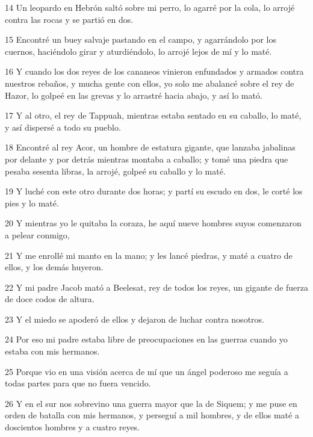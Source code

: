 \par 14 Un leopardo en Hebrón saltó sobre mi perro, lo agarré por la cola, lo arrojé contra las rocas y se partió en dos.

\par 15 Encontré un buey salvaje pastando en el campo, y agarrándolo por los cuernos, haciéndolo girar y aturdiéndolo, lo arrojé lejos de mí y lo maté.

\par 16 Y cuando los dos reyes de los cananeos vinieron enfundados y armados contra nuestros rebaños, y mucha gente con ellos, yo solo me abalancé sobre el rey de Hazor, lo golpeé en las grevas y lo arrastré hacia abajo, y así lo mató.

\par 17 Y al otro, el rey de Tappuah, mientras estaba sentado en su caballo, lo maté, y así dispersé a todo su pueblo.

\par 18 Encontré al rey Acor, un hombre de estatura gigante, que lanzaba jabalinas por delante y por detrás mientras montaba a caballo; y tomé una piedra que pesaba sesenta libras, la arrojé, golpeé su caballo y lo maté.

\par 19 Y luché con este otro durante dos horas; y partí su escudo en dos, le corté los pies y lo maté.

\par 20 Y mientras yo le quitaba la coraza, he aquí nueve hombres suyos comenzaron a pelear conmigo,

\par 21 Y me enrollé mi manto en la mano; y les lancé piedras, y maté a cuatro de ellos, y los demás huyeron.

\par 22 Y mi padre Jacob mató a Beelesat, rey de todos los reyes, un gigante de fuerza de doce codos de altura.

\par 23 Y el miedo se apoderó de ellos y dejaron de luchar contra nosotros.

\par 24 Por eso mi padre estaba libre de preocupaciones en las guerras cuando yo estaba con mis hermanos.

\par 25 Porque vio en una visión acerca de mí que un ángel poderoso me seguía a todas partes para que no fuera vencido.

\par 26 Y en el sur nos sobrevino una guerra mayor que la de Siquem; y me puse en orden de batalla con mis hermanos, y perseguí a mil hombres, y de ellos maté a doscientos hombres y a cuatro reyes.

